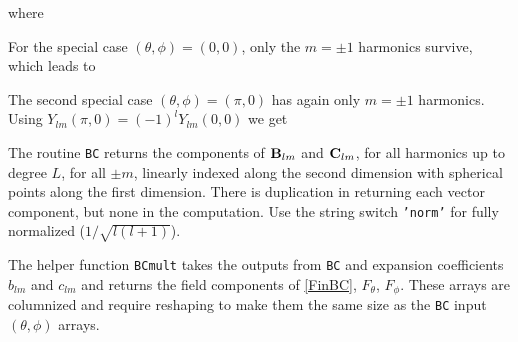 \noindent where

For the special case $(\theta,\phi) = (0,0)$, only the $m = \pm 1$ harmonics survive, which leads to

The second special case $(\theta,\phi) = (\pi,0)$ has again only $m = \pm 1$ harmonics.  Using $Y_{lm}(\pi,0) = (-1)^l Y_{lm}(0,0)$ we get

The routine \texttt{BC} returns the components of $\mathbf{B}_{lm}$ and $\mathbf{C}_{lm}$, for all harmonics up to degree $L$, for all $\pm m$, linearly indexed along the second dimension with spherical points along the first dimension. There is duplication in returning each vector component, but none in the computation.  Use the string switch \texttt{'norm'} for fully normalized ($1/\sqrt{l(l+1)}$). 

The helper function \texttt{BCmult} takes the outputs from \texttt{BC} and expansion coefficients $b_{lm}$ and $c_{lm}$ and returns the field components of \eqref{FinBC}, $F_{\theta}$, $F_{\phi}$. These arrays are columnized and require reshaping to make them the same size as the \texttt{BC} input $(\theta,\phi)$ arrays.

{\footnotesize
{}
}

{\footnotesize
{}
}

\clearpage
\newpage


